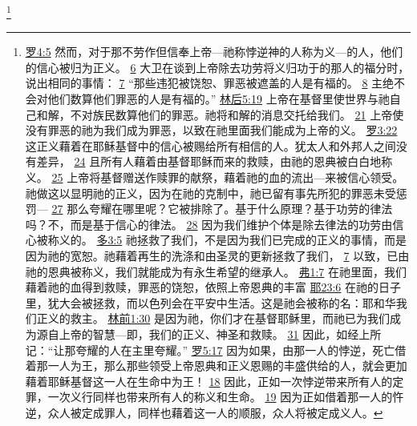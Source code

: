 \documentclass[12pt, a4paper, oneside]{ctexart}
\begin{document}
	\footnote {
		\href{https://biblehub.com/romans/4-5.htm}{罗4:5} 然而，对于那不劳作但信奉上帝---祂称悖逆神的人称为义---的人，他们的信心被归为正义。
		\href{https://biblehub.com/romans/4-6.htm}{6} 大卫在谈到上帝除去功劳将义归功于的那人的福分时，说出相同的事情：
		\href{https://biblehub.com/romans/4-7.htm}{7} “那些违犯被饶恕、罪恶被遮盖的人是有福的。
		\href{https://biblehub.com/romans/4-8.htm}{8} 主绝不会对他们数算他们罪恶的人是有福的。”
		\href{https://biblehub.com/2_corinthians/5-19.htm}{林后5:19} 上帝在基督里使世界与祂自己和解，不对族民数算他们的罪恶。祂将和解的消息交托给我们。
		\href{https://biblehub.com/2_corinthians/5-21.htm}{21} 上帝使没有罪恶的祂为我们成为罪恶，以致在祂里面我们能成为上帝的义。
		\href{https://biblehub.com/romans/3-22.htm}{罗3:22} 这正义藉着在耶稣基督中的信心被赐给所有相信的人。犹太人和外邦人之间没有差异，
		\href{https://biblehub.com/romans/3-24.htm}{24} 且所有人藉着由基督耶稣而来的救赎，由祂的恩典被白白地称义。
		\href{https://biblehub.com/romans/3-25.htm}{25} 上帝将基督赠送作赎罪的献祭，藉着祂的血的流出---来被信心领受。祂做这以显明祂的正义，因为在祂的克制中，祂已留有事先所犯的罪恶未受惩罚---
		\href{https://biblehub.com/romans/3-27.htm}{27} 那么夸耀在哪里呢？它被排除了。基于什么原理？基于功劳的律法吗？不，而是基于信心的律法。
		\href{https://biblehub.com/romans/3-28.htm}{28} 因为我们维护个体是除去律法的功劳由信心被称义的。
		\href{https://biblehub.com/titus/3-5.htm}{多3:5} 祂拯救了我们，不是因为我们已完成的正义的事情，而是因为祂的宽恕。祂藉着再生的洗涤和由圣灵的更新拯救了我们，
		\href{https://biblehub.com/titus/3-7.htm}{7} 以致，已由祂的恩典被称义，我们就能成为有永生希望的继承人。
        \href{https://biblehub.com/ephesians/1-7.htm}{弗1:7} 在祂里面，我们藉着祂的血得到救赎，罪恶的饶恕，依照上帝恩典的丰富
		\href{https://biblehub.com/jeremiah/23-6.htm}{耶23:6} 在祂的日子里，犹大会被拯救，而以色列会在平安中生活。这是祂会被称的名：耶和华我们正义的救主。
		\href{https://biblehub.com/1_corinthians/1-30.htm}{林前1:30} 是因为祂，你们才在基督耶稣里，而祂已为我们成为源自上帝的智慧---即，我们的正义、神圣和救赎。
		\href{https://biblehub.com/1_corinthians/1-31.htm}{31} 因此，如经上所记：“让那夸耀的人在主里夸耀。”
        \href{https://biblehub.com/romans/5-17.htm}{罗5:17} 因为如果，由那一人的悖逆，死亡借着那一人为王，那么那些领受上帝恩典和正义恩赐的丰盛供给的人，就会更加藉着耶稣基督这一人在生命中为王！
		\href{https://biblehub.com/romans/5-18.htm}{18} 因此，正如一次悖逆带来所有人的定罪，一次义行同样也带来所有人的称义和生命。
		\href{https://biblehub.com/romans/5-19.htm}{19} 因为正如借着那一人的忤逆，众人被定成罪人，同样也藉着这一人的顺服，众人将被定成义人。
	}
\end{document}
